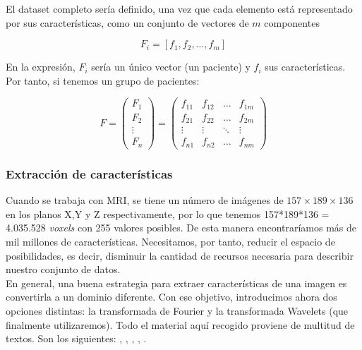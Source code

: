 El dataset completo sería definido, una vez que cada elemento está representado por sus características, como un conjunto de vectores de $m$ componentes

$$F_i = [f_1,f_2,\dots,f_m]$$

En la expresión, $F_i$ sería un único vector (un paciente) y $f_i$ sus características. Por tanto, si tenemos un grupo de pacientes:

$$F =  \begin{pmatrix}
F_{1} \\
F_{2} \\
\vdots \\
F_{n}
\end{pmatrix} = \begin{pmatrix}
f_{11}& f_{12}& \dots& f_{1m} \\
f_{21}&f_{22}&\dots&f_{2m} \\
\vdots& \vdots& \ddots& \vdots \\
f_{n1}&f_{n2}&\dots&f_{nm}
\end{pmatrix}$$

\subsubsection{Extracción de características}

Cuando se trabaja con MRI, se tiene un número de imágenes de $157\times189\times136$ en los planos X,Y y Z respectivamente, por lo que tenemos 157*189*136 = 4.035.528 \textit{voxels} con 255 valores posibles. De esta manera encontraríamos más de mil millones de características. Necesitamos, por tanto, reducir el espacio de posibilidades, es decir, disminuir la cantidad de recursos necesaria para describir nuestro conjunto de datos. \\

En general, una buena estrategia para extraer características de una imagen es convertirla a un dominio diferente. Con ese objetivo, introducimos ahora dos opciones distintas: la transformada de Fourier y la transformada Wavelets (que finalmente utilizaremos). Todo el material aquí recogido proviene de multitud de textos. Son los siguientes: \cite{math-image}, \cite{canada}, \cite{daube}, \cite{castro}, \cite{misiti}.

